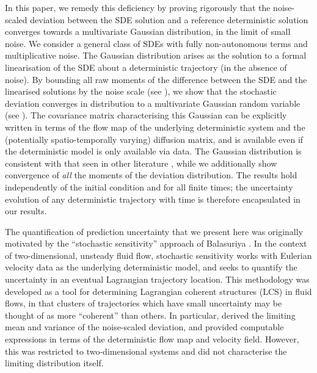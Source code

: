 In this paper, we remedy this deficiency by proving rigorously that the noise-scaled deviation between the SDE solution and a reference deterministic solution converges towards a multivariate Gaussian distribution, in the limit of small noise.
We consider a general class of SDEs with fully non-autonomous terms and multiplicative noise.
The Gaussian distribution arises as the solution to a formal linearisation of the SDE about a deterministic trajectory (in the absence of noise).
By bounding all raw moments of the difference between the SDE and the linearised solutions by the noise scale (see ), we show that the stochastic deviation converges in distribution to a multivariate Gaussian random variable (see ).
The covariance matrix characterising this Gaussian can be explicitly written in terms of the flow map of the underlying deterministic system and the (potentially spatio-temporally varying) diffusion matrix, and is available even if the deterministic model is only available via data.
The Gaussian distribution is consistent with that seen in other literature \cite{Jazwinski_2014_StochasticProcessesFiltering, Sanz-AlonsoStuart_2017_GaussianApproximationsSmall, SarkkaSolin_2019_AppliedStochasticDifferential}, while we additionally show convergence of \emph{all} the moments of the deviation distribution.
The results hold independently of the initial condition and for all finite times; the uncertainty evolution of any deterministic trajectory with time is therefore encapsulated in our results.

The quantification of prediction uncertainty that we present here was originally motivated by the ``stochastic sensitivity'' approach of Balasuriya \cite{Balasuriya_2020_StochasticSensitivityComputable}.
In the context of two-dimensional, unsteady fluid flow, stochastic sensitivity works with Eulerian velocity data as the underlying deterministic model, and seeks to quantify the uncertainty in an eventual Lagrangian trajectory location.
This methodology was developed as a tool for determining Lagrangian coherent structures (LCS) \cite{BalasuriyaEtAl_2018_GeneralizedLagrangianCoherent,HadjighasemEtAl_2017_CriticalComparisonLagrangian} in fluid flows, in that clusters of trajectories which have small uncertainty may be thought of as more ``coherent'' than others.
In particular, \cite{Balasuriya_2020_StochasticSensitivityComputable} derived the limiting mean and variance of the noise-scaled deviation, and provided computable expressions in terms of the deterministic flow map and velocity field.
However, this was restricted to two-dimensional systems and did not characterise the limiting distribution itself.

